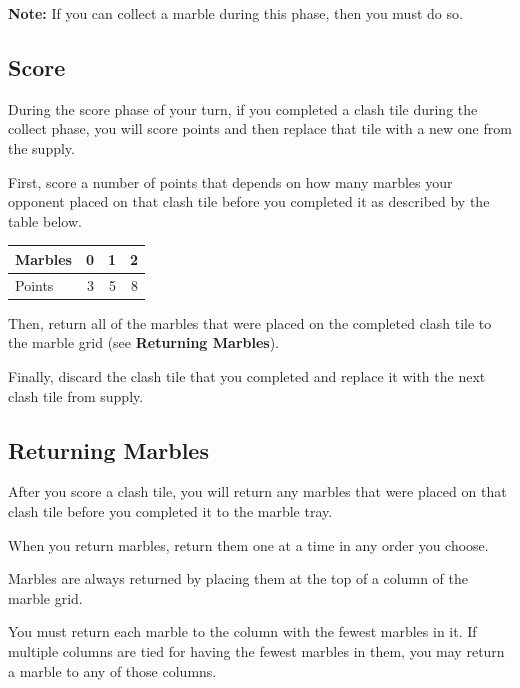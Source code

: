 \textbf{Note:} If you can collect a marble during this phase, then you must do so. 

\newpage

\subsection*{Score}
During the score phase of your turn, if you completed a clash tile during the collect phase, you will score points and then replace that tile with a new one from the supply.

First, score a number of points that depends on how many marbles your opponent placed on that clash tile before you completed it as described by the table below.

\begin{center}
\begin{tabular}{lrrr}\toprule
Marbles & 0 & 1 & 2\\\midrule
Points & 3 & 5 & 8\\\bottomrule
\end{tabular}
\end{center}

Then, return all of the marbles that were placed on the completed clash tile to the marble grid (see \textbf{Returning Marbles}).

Finally, discard the clash tile that you completed and replace it with the next clash tile from supply. 

\newpage

\subsection*{Returning Marbles}
After you score a clash tile, you will return any marbles that were placed on that clash tile before you completed it to the marble tray.

When you return marbles, return them one at a time in any order you choose.

Marbles are always returned by placing them at the top of a column of the marble grid.

You must return each marble to the column with the fewest marbles in it.
If multiple columns are tied for having the fewest marbles in them, you may return a marble to any of those columns.

